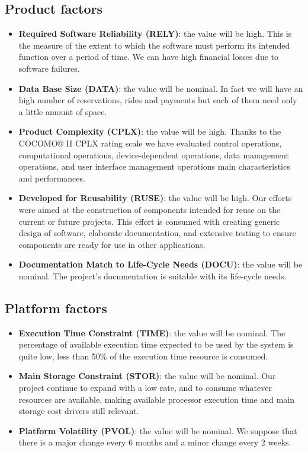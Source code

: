 \subsection{Product factors}
\begin{itemize}
    \item \textbf{Required Software Reliability (RELY)}: the value will be high. This is the measure of the extent to which the software must perform its intended function over a period of time. We can have high financial losses due to software failures.
    \item \textbf{Data Base Size (DATA)}: the value will be nominal. In fact we will have an high number of reservations, rides and payments but each of them need only a little amount of space.
    \item \textbf{Product Complexity (CPLX)}: the value will be high. Thanks to the COCOMO® II CPLX rating scale we have evaluated control operations, computational operations, device-dependent operations, data management operations, and user interface management operations main characteristics and performances.
	\item \textbf{Developed for Reusability (RUSE)}: the value will be high. Our efforts were aimed at the construction of components intended for reuse on the current or future projects. This effort is consumed with creating generic design of software, elaborate documentation, and extensive testing to ensure components are ready for use in other applications.
	\item \textbf{Documentation Match to Life-Cycle Needs (DOCU)}: the value will be nominal. The project's documentation is suitable with its life-cycle needs.
\end{itemize}

\subsection{Platform factors}
\begin{itemize}
    \item \textbf{Execution Time Constraint (TIME)}: the value will be nominal. The percentage of available execution time expected to be used by the system is quite low,  less than 50\% of the execution time resource is consumed.
    \item \textbf{Main Storage Constraint (STOR)}: the value will be nominal. Our project continue to expand with a low rate, and to consume whatever resources are available, making available processor execution time and main storage cost drivers still relevant.
    \item \textbf{Platform Volatility (PVOL)}: the value will be nominal. We suppose that there is a major change every 6 months and a minor change every 2 weeks.
\end{itemize}

